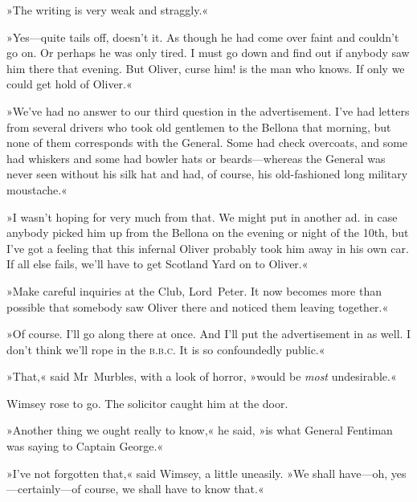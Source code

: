 »The writing is very weak and straggly.«

»Yes—quite tails off, doesn't it. As though he had come over faint and couldn't go on. Or perhaps he was only tired. I must go down and find out if anybody saw him there that evening. But Oliver, curse him! is the man who knows. If only we could get hold of Oliver.«

»We've had no answer to our third question in the advertisement. I've had letters from several drivers who took old gentlemen to the Bellona that morning, but none of them corresponds with the General. Some had check overcoats, and some had whiskers and some had bowler hats or beards—whereas the General was never seen without his silk hat and had, of course, his old-fashioned long military moustache.«

»I wasn't hoping for very much from that. We might put in another ad. in case anybody picked him up from the Bellona on the evening or night of the 10th, but I've got a feeling that this infernal Oliver probably took him away in his own car. If all else fails, we'll have to get Scotland Yard on to Oliver.«

»Make careful inquiries at the Club, Lord~Peter. It now becomes more than possible that somebody saw Oliver there and noticed them leaving together.«

»Of course. I'll go along there at once. And I'll put the advertisement in as well. I don't think we'll rope in the \textsc{b.b.c.} It is so confoundedly public.«

»That,« said Mr~Murbles, with a look of horror, »would be \textit{most} undesirable.«

Wimsey rose to go. The solicitor caught him at the door.

»Another thing we ought really to know,« he said, »is what General Fentiman was saying to Captain George.«

»I've not forgotten that,« said Wimsey, a little uneasily. »We shall have—oh, yes—certainly—of course, we shall have to know that.«